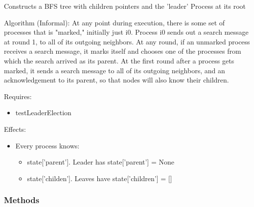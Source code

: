Constructs a BFS tree with children pointers and the 'leader' Process at 
its root

Algorithm (Informal): At any point during execution, there is some set of 
processes that is "marked," initially just i0. Process i0 sends out a 
search message at round 1, to all of its outgoing neighbors. At any round, 
if an unmarked process receives a search message, it marks itself and 
chooses one of the processes from which the search arrived as its parent. 
At the first round after a process gets marked, it sends a search message 
to all of its outgoing neighbors, and an acknowledgement to its parent, so 
that nodes will also know their children.

Requires:

\begin{itemize}
\setlength{\parskip}{0.6ex}
  \item testLeaderElection

\end{itemize}

Effects:

\begin{itemize}
\setlength{\parskip}{0.6ex}
  \item Every process knows:

    \begin{itemize}
    \setlength{\parskip}{0.6ex}
      \item state['parent']. Leader has state['parent'] = None

      \item state['childen']. Leaves have state['children'] = []

    \end{itemize}

\end{itemize}



  \subsubsection{Methods}

    \label{datk:core:algs:SynchBFSAck:is_i0}

